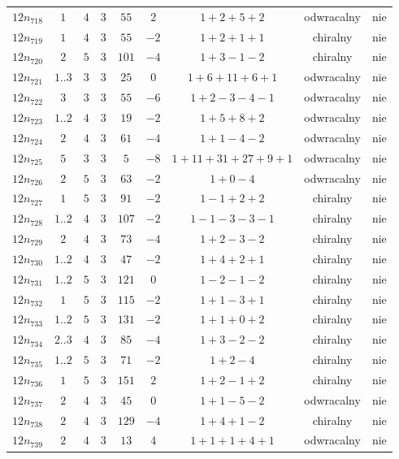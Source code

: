 \begin{longtable}{ccccccccc}
$12n_{718}$ & $1$ & $4$ & $3$ & $55$ & $2$ & $1+2+5+2$ & odwracalny & nie \\
$12n_{719}$ & $1$ & $4$ & $3$ & $55$ & $-2$ & $1+2+1+1$ & chiralny & nie \\
$12n_{720}$ & $2$ & $5$ & $3$ & $101$ & $-4$ & $1+3-1-2$ & chiralny & nie \\
$12n_{721}$ & $1..3$ & $3$ & $3$ & $25$ & $0$ & $1+6+11+6+1$ & odwracalny & nie \\
$12n_{722}$ & $3$ & $3$ & $3$ & $55$ & $-6$ & $1+2-3-4-1$ & odwracalny & nie \\
$12n_{723}$ & $1..2$ & $4$ & $3$ & $19$ & $-2$ & $1+5+8+2$ & odwracalny & nie \\
$12n_{724}$ & $2$ & $4$ & $3$ & $61$ & $-4$ & $1+1-4-2$ & odwracalny & nie \\
$12n_{725}$ & $5$ & $3$ & $3$ & $5$ & $-8$ & $1+11+31+27+9+1$ & odwracalny & nie \\
$12n_{726}$ & $2$ & $5$ & $3$ & $63$ & $-2$ & $1+0-4$ & odwracalny & nie \\
$12n_{727}$ & $1$ & $5$ & $3$ & $91$ & $-2$ & $1-1+2+2$ & chiralny & nie \\
$12n_{728}$ & $1..2$ & $4$ & $3$ & $107$ & $-2$ & $1-1-3-3-1$ & chiralny & nie \\
$12n_{729}$ & $2$ & $4$ & $3$ & $73$ & $-4$ & $1+2-3-2$ & chiralny & nie \\
$12n_{730}$ & $1..2$ & $4$ & $3$ & $47$ & $-2$ & $1+4+2+1$ & chiralny & nie \\
$12n_{731}$ & $1..2$ & $5$ & $3$ & $121$ & $0$ & $1-2-1-2$ & chiralny & nie \\
$12n_{732}$ & $1$ & $5$ & $3$ & $115$ & $-2$ & $1+1-3+1$ & chiralny & nie \\
$12n_{733}$ & $1..2$ & $5$ & $3$ & $131$ & $-2$ & $1+1+0+2$ & chiralny & nie \\
$12n_{734}$ & $2..3$ & $4$ & $3$ & $85$ & $-4$ & $1+3-2-2$ & chiralny & nie \\
$12n_{735}$ & $1..2$ & $5$ & $3$ & $71$ & $-2$ & $1+2-4$ & chiralny & nie \\
$12n_{736}$ & $1$ & $5$ & $3$ & $151$ & $2$ & $1+2-1+2$ & chiralny & nie \\
$12n_{737}$ & $2$ & $4$ & $3$ & $45$ & $0$ & $1+1-5-2$ & odwracalny & nie \\
$12n_{738}$ & $2$ & $4$ & $3$ & $129$ & $-4$ & $1+4+1-2$ & chiralny & nie \\
$12n_{739}$ & $2$ & $4$ & $3$ & $13$ & $4$ & $1+1+1+4+1$ & odwracalny & nie \\

\end{longtable}
